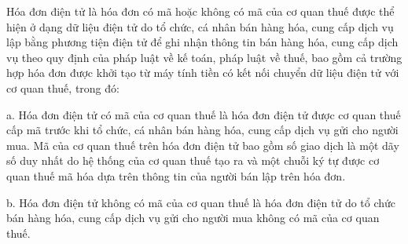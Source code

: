 
Hóa đơn điện tử là hóa đơn có mã hoặc không có mã của cơ quan thuế được thể hiện ở dạng dữ liệu điện tử do tổ chức, cá nhân bán hàng hóa, cung cấp dịch vụ lập bằng phương tiện điện tử để ghi nhận thông tin bán hàng hóa, cung cấp dịch vụ theo quy định của pháp luật về kế toán, pháp luật về thuế, bao gồm cả trường hợp hóa đơn được khởi tạo từ máy tính tiền có kết nối chuyển dữ liệu điện tử với cơ quan thuế, trong đó:

a. Hóa đơn điện tử có mã của cơ quan thuế là hóa đơn điện tử được cơ quan thuế cấp mã trước khi tổ chức, cá nhân bán hàng hóa, cung cấp dịch vụ gửi cho người mua. Mã của cơ quan thuế trên hóa đơn điện tử bao gồm số giao dịch là một dãy số duy nhất do hệ thống của cơ quan thuế tạo ra và một chuỗi ký tự được cơ quan thuế mã hóa dựa trên thông tin của người bán lập trên hóa đơn.

b. Hóa đơn điện tử không có mã của cơ quan thuế là hóa đơn điện tử do tổ chức bán hàng hóa, cung cấp dịch vụ gửi cho người mua không có mã của cơ quan thuế.